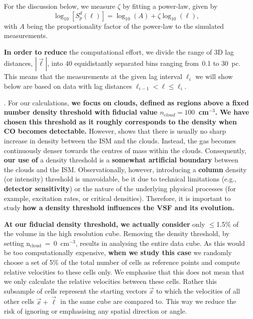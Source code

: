 For the discussion below, we measure $\zeta$ by fitting a power-law,
given by
\begin{equation}
	\log_{10}\left[ S^d_p(\ell) \right] = \log_{10}\left(A\right) + \zeta \log_{10}(\ell) ,
	\label{equ:method:fitting}
\end{equation}
with $A$ being the proportionality factor of the power-law to the simulated measurements.

\textbf{In order to reduce} the computational effort, we divide the range of 3D lag distances, $|\vec{\ell}|$, into 40 equidistantly separated bins ranging from~0.1 to 30~pc.
This means that the measurements at the given lag interval $\ell_i$ we will show below are based on data with lag distances $\ell_{i-1} < \ell \leq \ell_i$.

.
For our calculations, \textbf{we focus on clouds, defined as regions above a fixed number density threshold with fiducial value $n_{\mathrm cloud} = 100$~cm$^{-3}$.  We have chosen this threshold as it roughly corresponds to the density when CO becomes detectable. }
However,  shows that there is usually no sharp increase in density between the ISM and the clouds. 
Instead, the gas becomes continuously denser towards the centres of mass within the clouds. 
Consequently, \textbf{our use of} a density threshold is a \textbf{somewhat artificial boundary} between the clouds and the ISM. Observationally, however, introducing a \textbf{column} density (or intensity) threshold is unavoidable, be it due to technical limitations (e.g., \textbf{detector sensitivity}) or the nature of the underlying physical processes (for example, excitation rates, or critical densities).
Therefore, it is important to study \textbf{how a density threshold influences the VSF and its evolution.}

\textbf{At our fiducial density threshold, we actually consider} only $\leq$1.5\% of the volume in the high resolution cube.
Removing the density threshold, by setting n$_\mathrm{cloud}$~=~0~cm$^{-3}$, results in analysing the entire data cube.
As this would be too computationally expensive, \textbf{when we study this case} we randomly choose a set of 5\% of the total number of cells as reference points and compute relative velocities to these cells only.
We emphasise that this does not mean that we only calculate the relative velocities between these cells.
Rather this subsample of cells represent the starting vectors $\vec{x}$ to which the velocities of all other cells $\vec{x} + \vec{\ell}$ in the same cube are compared to.
This way we reduce the risk of ignoring or emphasising any spatial direction or angle.

